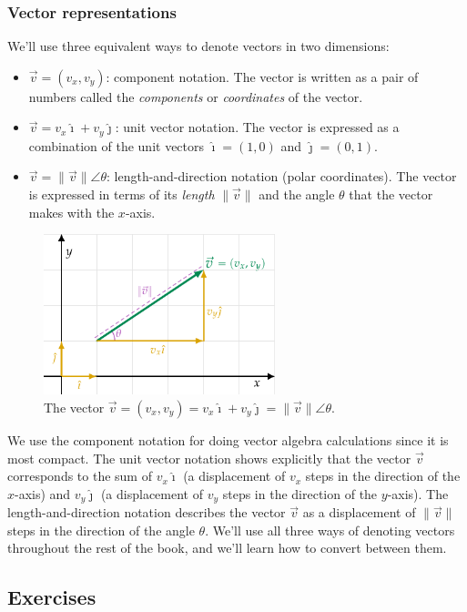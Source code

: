 		\subsubsection{Vector representations}

			We'll use three equivalent ways to denote vectors in two dimensions:
			\begin{itemize}
			    \item   	$\vec{v} =(v_x, v_y)$: component notation.
					The vector is written as a pair of numbers called the \emph{components} or \emph{coordinates} of the vector.	
			    \item 	$\vec{v} =v_x\hat{\imath}+ v_y\hat{\jmath}$: unit vector notation.
					The vector is expressed as a combination of the unit vectors
					$\hat{\imath} = (1,0)$ and $ \hat{\jmath} = (0,1)$.
			    \item   	$\vec{v}=\|\vec{v}\|\angle \theta$: length-and-direction notation (polar coordinates).
					The vector is expressed in terms of its \emph{length} $\|\vec{v}\|$
					and the angle $\theta$ that the vector makes with the $x$-axis.
			\end{itemize}

			\begin{figure}[htb]
				\centering
				\includegraphics[width=0.6\textwidth]{figures/vectors/vector_components_annotated.pdf}
				\vspace{-2mm}
				\caption{The vector $\vec{v}=(v_x,v_y) = v_x\hat{\imath}+ v_y\hat{\jmath} = \|\vec{v}\|\angle \theta$.}
				\label{fig:vector_components_annotated}
			\end{figure}

			\noindent
			We use the component notation for doing vector algebra calculations since it is most compact.
			The unit vector notation shows explicitly that the vector $\vec{v}$ corresponds to the sum of
			$v_x\hat{\imath}$ (a displacement of $v_x$ steps in the direction of the $x$-axis)
			and $v_y\hat{\jmath}$ (a displacement of $v_y$ steps in the direction of the $y$-axis).
			The length-and-direction notation describes the vector $\vec{v}$
			as a displacement of $\|\vec{v}\|$ steps in the direction of the angle $\theta$.
			We'll use all three ways of denoting vectors throughout the rest of the book,
			and we'll learn how to convert between them.


	\subsection{Exercises}
	\label{basis:exercises}

		

